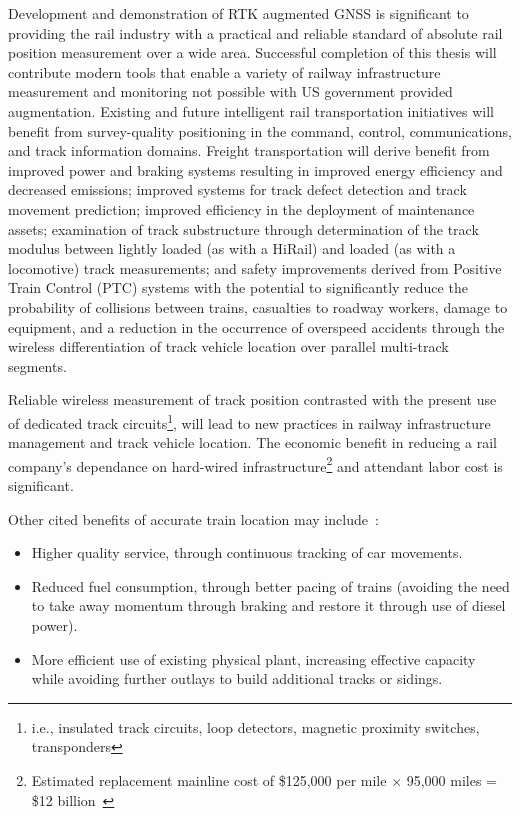 Development and demonstration of RTK augmented GNSS is significant to providing the rail industry with a practical and reliable standard of absolute rail position measurement over a wide area. Successful completion of this thesis will contribute modern tools that enable a variety of railway infrastructure measurement and monitoring not possible with US government provided augmentation. Existing and future intelligent rail transportation initiatives will benefit from survey-quality positioning in the command, control, communications, and track information domains. Freight transportation will derive benefit from  improved power and braking systems resulting in improved energy efficiency and decreased emissions; improved systems for track defect detection and track movement prediction; improved efficiency in the deployment of maintenance assets; examination of track substructure through determination of the track modulus between lightly loaded (as with a HiRail) and loaded (as with a locomotive) track measurements; and safety improvements derived from Positive Train Control (PTC) systems with the potential to significantly reduce the probability of collisions between trains, casualties to roadway workers, damage to equipment, and a reduction in the occurrence of overspeed accidents through the wireless differentiation of track vehicle location over parallel multi-track segments.

Reliable wireless measurement of track position contrasted with the present use of dedicated track circuits\footnote{i.e., insulated track circuits, loop detectors, magnetic proximity switches, transponders}, will lead to new practices in railway infrastructure management and track vehicle location. The economic benefit in reducing a rail company's dependance on hard-wired infrastructure\footnote{Estimated replacement mainline cost of \$125,000 per mile $\times$ 95,000 miles = \$12 billion~\citep{ResorPTC}} and attendant labor cost is significant.

Other cited benefits of accurate train location may include~\citep[pp.12-13]{1995FRADiffe}:
\begin{itemize}
\firmlist
	\item Higher quality service, through continuous tracking of car movements.
	\item Reduced fuel consumption, through better pacing of trains (avoiding the need to take away momentum through braking and restore it through use of diesel power).
	\item More efficient use of existing physical plant, increasing effective capacity while avoiding further outlays to build additional tracks or sidings.
\end{itemize}

